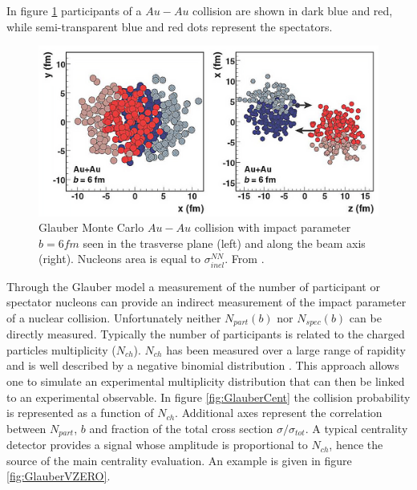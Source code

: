 In figure \ref{fig:GlauberAuAu} participants of a $Au-Au$ collision are shown in dark blue and red, while semi-transparent blue and red dots represent the spectators.

\begin{figure}[!t]
\begin{center}
\includegraphics[width=0.9\linewidth]{Chapters/Analysis/Figs/glauber-pbpb.pdf}
\caption{Glauber Monte Carlo $Au-Au$ collision with impact parameter $b=6 fm$ seen in the trasverse plane (left) and along the beam axis (right). Nucleons area is equal to $\sigma_{inel}^{NN}$. From \cite{Miller:2007ri}.}
\label{fig:GlauberAuAu}
\end{center}
\end{figure}

Through the Glauber model a measurement of the number of participant or spectator nucleons can provide an indirect measurement of the impact parameter of a nuclear collision.
Unfortunately neither $N_{part}(b)$ nor $N_{spec}(b)$ can be directly measured.
Typically the number of participants is related to the charged particles multiplicity ($N_{ch}$).
$N_{ch}$ has been measured over a large range of rapidity and is well described by a negative binomial distribution \cite{Aamodt:2009aa}.
This approach allows one to simulate an experimental multiplicity distribution that can then be linked to an experimental observable.
In figure \ref{fig:GlauberCent} the collision probability is represented as a function of $N_{ch}$. Additional axes represent the correlation between $N_{part}$, $b$ and fraction of the total cross section $\sigma/\sigma_{tot}$.
A typical centrality detector provides a signal whose amplitude is proportional to $N_{ch}$, hence the source of the main centrality evaluation.
An example is given in figure \ref{fig:GlauberVZERO}.


